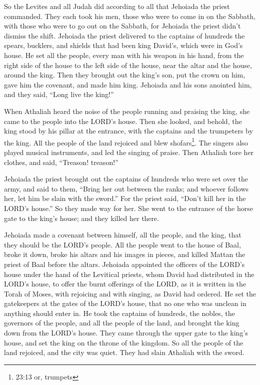 \myverse{}So the Levites and all Judah did according to all that Jehoiada
the priest commanded. They each took his men, those who were to come in on the Sabbath, with those who
were to go out on the Sabbath, for Jehoiada the priest didn’t dismiss the shift.
\myverse{}Jehoiada the priest delivered to the captains of hundreds the spears, bucklers,
and shields that had been king David’s, which were in God’s house.
\myverse{}He set all the people, every man with his weapon in his hand, from the right
side of the house to the left side of the house, near the altar and the house, around the king.
\myverse{}Then they brought out the king’s son, put the crown on him, gave him the
covenant, and made him king. Jehoiada and his sons anointed him, and they said, “Long live the king!”

\myverse{}When Athaliah heard the noise of the people running and praising
the king, she came to the people into the LORD’s house.
\myverse{}Then she looked, and behold, the king stood by his pillar at the entrance,
with the captains and the trumpeters by the king. All the people of the land rejoiced and blew shofars\footnote{23:13 or, trumpets}.
The singers also played musical instruments, and led the singing of praise. Then Athaliah tore her clothes,
and said, “Treason! treason!”

\myverse{}Jehoiada the priest brought out the captains of hundreds who
were set over the army, and said to them, “Bring her out between the ranks; and whoever follows her, let
him be slain with the sword.” For the priest said, “Don’t kill her in the LORD’s house.”
\myverse{}So they made way for her. She went to the entrance of the horse gate to the
king’s house; and they killed her there.

\myverse{}Jehoiada made a covenant between himself, all the people, and
the king, that they should be the LORD’s people.
\myverse{}All the people went to the house of Baal, broke it down, broke his altars
and his images in pieces, and killed Mattan the priest of Baal before the altars.
\myverse{}Jehoiada appointed the officers of the LORD’s house under the hand of the
Levitical priests, whom David had distributed in the LORD’s house, to offer the burnt offerings of the
LORD, as it is written in the Torah of Moses, with rejoicing and with singing, as David had ordered.
\myverse{}He set the gatekeepers at the gates of the LORD’s house, that no one who
was unclean in anything should enter in.
\myverse{}He took the captains of hundreds, the nobles, the governors of the people,
and all the people of the land, and brought the king down from the LORD’s house. They came through the
upper gate to the king’s house, and set the king on the throne of the kingdom.
\myverse{}So all the people of the land rejoiced, and the city was quiet. They had
slain Athaliah with the sword.


